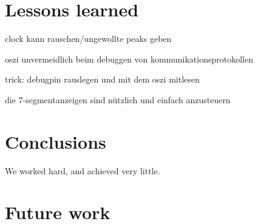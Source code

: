 \documentclass[a4paper
               ,10pt
               ,DIV=10 %
               ,BCOR=0.3cm
               ,pagesize %
               ,headings=small
               ,bibtotoc
               ]
               {scrartcl}
\begin{document}
\section{Lessons learned}

clock kann rauschen/ungewollte peaks geben

oszi unvermeidlich beim debuggen von kommunikationsprotokollen

trick: debugpin rauslegen und mit dem oszi mitlesen

die 7-segmentanzeigen sind nützlich und einfach anzusteuern




\section{Conclusions}\label{conclusions}
We worked hard, and achieved very little.

\section{Future work}



\end{document}
